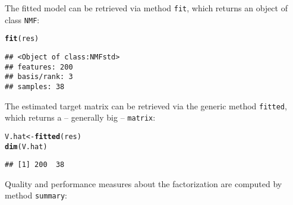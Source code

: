 \documentclass[a4paper]{article}\usepackage[]{graphicx}\usepackage[]{color}
\makeatletter
\newcommand{\hlstd}[1]{\textcolor[rgb]{0.345,0.345,0.345}{#1}}%
\newcommand{\hlkwb}[1]{\textcolor[rgb]{0.69,0.353,0.396}{#1}}%
\newcommand{\hlkwd}[1]{\textcolor[rgb]{0.737,0.353,0.396}{\textbf{#1}}}%
\newenvironment{kframe}{%
 \def\at@end@of@kframe{}%
 \ifinner\ifhmode%
  \def\at@end@of@kframe{\end{minipage}}%
  \begin{minipage}{\columnwidth}%
 \fi\fi%
 \def\FrameCommand##1{\hskip\@totalleftmargin \hskip-\fboxsep
 \colorbox{shadecolor}{##1}\hskip-\fboxsep
     \hskip-\linewidth \hskip-\@totalleftmargin \hskip\columnwidth}%
 \MakeFramed {\advance\hsize-\width
   \@totalleftmargin\z@ \linewidth\hsize
   \@setminipage}}%
 {\par\unskip\endMakeFramed%
 \at@end@of@kframe}
\newenvironment{knitrout}{}{} %
\let\code=\texttt
\makeatother
\begin{document}
The fitted model can be retrieved via method \code{fit}, which returns an object of class \code{NMF}:

\begin{knitrout}
\color{fgcolor}\begin{kframe}
\begin{alltt}
\hlkwd{fit}\hlstd{(res)}
\end{alltt}
\begin{verbatim}
## <Object of class:NMFstd>
## features: 200 
## basis/rank: 3 
## samples: 38
\end{verbatim}
\end{kframe}
\end{knitrout}


The estimated target matrix can be retrieved via the generic method \code{fitted}, which returns a -- generally big -- \code{matrix}:

\begin{knitrout}
\color{fgcolor}\begin{kframe}
\begin{alltt}
\hlstd{V.hat} \hlkwb{<-} \hlkwd{fitted}\hlstd{(res)}
\hlkwd{dim}\hlstd{(V.hat)}
\end{alltt}
\begin{verbatim}
## [1] 200  38
\end{verbatim}
\end{kframe}
\end{knitrout}


Quality and performance measures about the factorization are computed by method \code{summary}:
\end{document}
